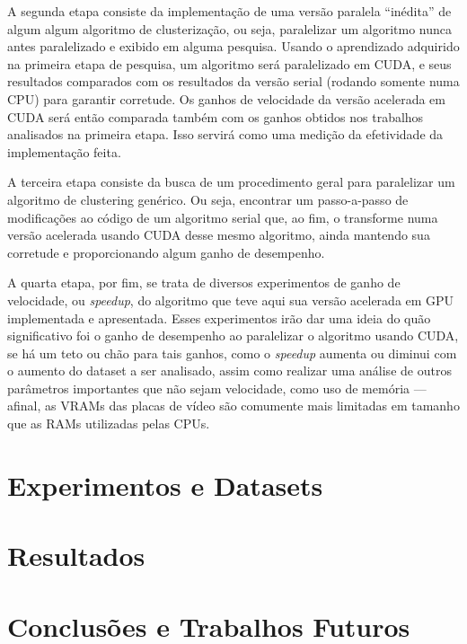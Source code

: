 \documentclass[12pt, %
openright, 
oneside, %
a4paper,    %
brazil]{facom-ufu-abntex2}
\begin{document}
A segunda etapa consiste da implementação de uma versão paralela \enquote{inédita} de algum algum algoritmo de clusterização, ou seja, paralelizar um algoritmo nunca antes paralelizado e exibido em alguma pesquisa. Usando o aprendizado adquirido na primeira etapa de pesquisa, um algoritmo será paralelizado em CUDA, e seus resultados comparados com os resultados da versão serial (rodando somente numa CPU) para garantir corretude. Os ganhos de velocidade da versão acelerada em CUDA será então comparada também com os ganhos obtidos nos trabalhos analisados na primeira etapa. Isso servirá como uma medição da efetividade da implementação feita.

A terceira etapa consiste da busca de um procedimento geral para paralelizar um algoritmo de clustering genérico. Ou seja, encontrar um passo-a-passo de modificações ao código de um algoritmo serial que, ao fim, o transforme numa versão acelerada usando CUDA desse mesmo algoritmo, ainda mantendo sua corretude e proporcionando algum ganho de desempenho.

A quarta etapa, por fim, se trata de diversos experimentos de ganho de velocidade, ou \textit{speedup}, do algoritmo que teve aqui sua versão acelerada em GPU implementada e apresentada. Esses experimentos irão dar uma ideia do quão significativo foi o ganho de desempenho ao paralelizar o algoritmo usando CUDA, se há um teto ou chão para tais ganhos, como o \textit{speedup} aumenta ou diminui com o aumento do dataset a ser analisado, assim como realizar uma análise de outros parâmetros importantes que não sejam velocidade, como uso de memória --- afinal, as VRAMs das placas de vídeo são comumente mais limitadas em tamanho que as RAMs utilizadas pelas CPUs.

\chapter{Experimentos e Datasets}

\chapter{Resultados}

\chapter{Conclusões e Trabalhos Futuros}



\end{document}
